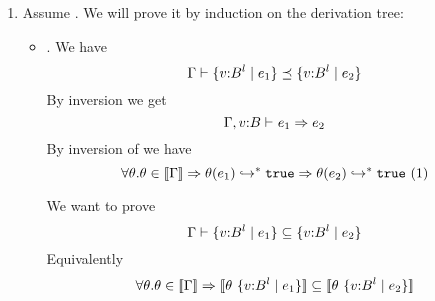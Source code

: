 %
\begin{enumerate}
\item \label{proof:ssub} Assume . 
We will prove it by induction on the derivation tree:

\begin{itemize}
\item\rsubbase. We have
$$\Gamma \vdash \{ {v} \text{:} {B^{l}} \mid e_1 \} \preceq \{ {v} \text{:} {B^{l}} \mid e_2 \}$$
By inversion we get 
$$\Gamma, v\text{:} B \vdash_{} e_1 \Rightarrow e_2$$
By inversion of \rimpl we have
$$	\forall \theta. \theta\in [\![\Gamma]\!]\Rightarrow
	\theta(e_1) \hookrightarrow_{}^{*} \mathtt{true}\Rightarrow\theta(e_2) \hookrightarrow_{}^{*} \mathtt{true}
\ (1)$$

We want to prove 
$$\Gamma \vdash \{ {v} \text{:} {B^{l}} \mid e_1 \} \subseteq \{ {v} \text{:} {B^{l}} \mid e_2 \}$$
Equivalently
$$	
	\forall \theta . \iswellformedtheta{\Gamma}{\theta} \Rightarrow 
	\interp{\theta\ \tref{v}{B}{l}{e_1}} \subseteq \interp{\theta\ \tref{v}{B}{l}{e_2}}
$$


\end{itemize}
\end{enumerate}
